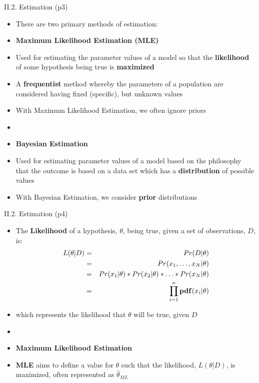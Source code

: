 \documentclass[handout]{beamer}
\newcommand{\strong}[1]{\textbf{\color{teal} #1}}
\newcommand{\stronger}[1]{\textbf{\color{purple} #1}}
\begin{document}
\begin{frame}{II.2. Estimation (p3)}
\begin{itemize}
\item[] There are two primary methods of estimation:
\item[(1)] \stronger{Maximum Likelihood Estimation (MLE)}
\item Used for estimating the parameter values of a model so that the \stronger{likelihood} of some hypothesis being true is \strong{maximized}
\item A \stronger{frequentist} method whereby the parameters of a population are considered having fixed (specific), but unknown values
\item With Maximum Likelihood Estimation, we often ignore priors
\item[]
\item[(2)] \stronger{Bayesian Estimation}
\item Used for estimating parameter values of a model based on the philosophy that the outcome is based on a data set which has a \strong{distribution} of possible values
\item With Bayesian Estimation, we consider \stronger{prior} distributions
\end{itemize}
\end{frame}
\begin{frame}{II.2. Estimation (p4)}
\label{slide:likelihood}
\begin{itemize}
\item The \stronger{Likelihood} of a hypothesis, $\theta$, being true, given a set of observations, $D$, is:
\begin{eqnarray*}
L ( \theta | D ) & = & Pr( D | \theta ) \\
                 & = & Pr( x_1, \ldots, x_N | \theta ) \\
                 & = & Pr(x_1|\theta) * Pr(x_2|\theta) * \ldots * Pr(x_N|\theta) \\
                 & = & \prod_{i=1}^n{ {\bf pdf}( x_i | \theta ) }
\end{eqnarray*}
\item[] which represents the likelihood that $\theta$ will be true, given $D$
\item[]
\item[] \stronger{Maximum Likelihood Estimation}
\item \stronger{MLE} aims to define a value for $\theta$ such that the likelihood, $L(\theta|D)$, is maximized, often represented as $\hat{\theta}_{ML}$
\end{itemize}
\end{frame}
\end{document}
